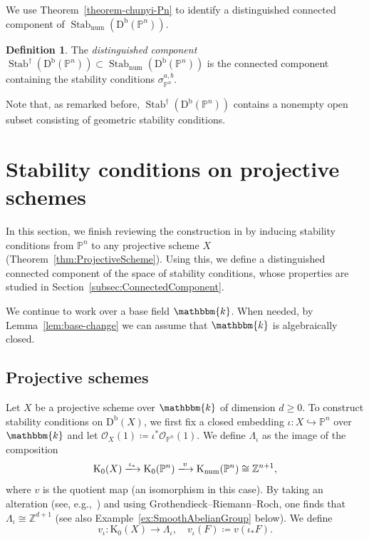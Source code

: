 \documentclass[11pt, reqno]{amsart}
\numberwithin{equation}{section}
\theoremstyle{plain}
\theoremstyle{remark}
\theoremstyle{definition}
\newtheorem{definition}[theorem]{Definition}
\theoremstyle{italicsname}
\newcommand{\Db}{\mathrm{D^b}}
\newcommand{\num}{\mathrm{num}}
\DeclareMathOperator{\Knum}{\rK_{\num}}
\DeclareMathOperator{\Stab}{Stab}
\newcommand{\cO}{\mathcal{O}}
\newcommand{\rK}{\mathrm{K}}
\newcommand{\KK}{\mathbbm{k}}
\def\ZZ{\ensuremath{\mathbb{Z}}}
\def\PP{\ensuremath{\mathbb{P}}}
\begin{document}
We use Theorem~\ref{theorem-chunyi-Pn} to identify a distinguished connected component of $\Stab_\mathrm{num}(\Db(\PP^n))$.

\begin{definition}
The \emph{distinguished component} $\Stab^\dagger(\Db(\PP^n))\subset\Stab_\mathrm{num}(\Db(\PP^n))$ is the connected component containing the stability conditions $\sigma_{\PP^n}^{a,b}$.
\end{definition}

Note that, as remarked before, $\Stab^\dagger(\Db(\PP^n))$ contains a nonempty open subset consisting of geometric stability conditions.



\section{Stability conditions on projective schemes}\label{sec:ProjectiveSchemes}

In this section, we finish reviewing the construction in \cite{chunyi-stability} by inducing stability conditions from $\PP^n$ to any projective scheme $X$ (Theorem~\ref{thm:ProjectiveScheme}). 
Using this, we define a distinguished connected component of the space of stability conditions, whose properties are studied in Section~\ref{subsec:ConnectedComponent}.

We continue to work over a base field $\KK$. 
When needed, by Lemma~\ref{lem:base-change} we can assume that $\KK$ is algebraically closed. 

\subsection{Projective schemes}\label{subsec:ProjectiveSchemes}
Let $X$ be a projective scheme over $\KK$ of dimension $d\geq0$.
To construct stability conditions on $\Db(X)$, we first fix a closed embedding $\iota\colon X\hookrightarrow\PP^n$ over $\KK$ and let $\cO_X(1)\coloneqq\iota^*\cO_{\PP^n}(1)$. 
We define $\Lambda_{\iota}$ as the image of the composition 
\begin{equation*}
    \rK_0(X) \xlongrightarrow{\iota_*} \rK_0(\PP^n) \xlongrightarrow{v} \Knum(\PP^n) \cong \ZZ^{n+1},
\end{equation*}
where $v$ is the quotient map (an isomorphism in this case). 
By taking an alteration (see, e.g.,~\cite[Lemma~12.7]{stability-families}) and using Grothendieck--Riemann--Roch, one finds that $\Lambda_{\iota} \cong \ZZ^{d+1}$ (see also Example~\ref{ex:SmoothAbelianGroup} below). 
We define
\[
v_{\iota}\colon\rK_0(X)\longrightarrow\Lambda_{\iota}, \quad v_{\iota}(F)\coloneqq v(\iota_*F). 
\]
\end{document}
